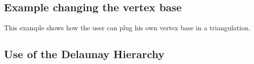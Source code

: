
\subsection{Example changing the vertex base}
This example shows how the user can plug his own vertex base in a
triangulation.


\subsection{Use of the Delaunay Hierarchy}

